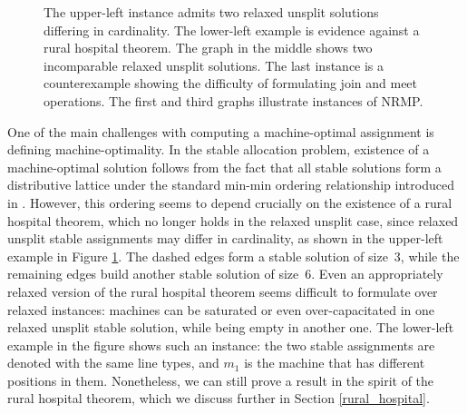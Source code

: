 \documentclass{llncs}
\newcommand{\mycaption}[2]
 {\begin{center} \parbox{4in}{\caption{\small #2 \label{#1}}} \end{center}}
\begin{document}
\begin{figure}[t]
\begin{center}
\begin{minipage}{.35\textwidth}
\end{minipage}
\mycaption{label6}{The upper-left instance admits two relaxed unsplit solutions differing in
cardinality.  The lower-left example is evidence against a rural hospital theorem.  The graph in the middle shows two incomparable relaxed unsplit solutions. The last instance is a counterexample showing the difficulty of formulating join and meet operations. The first and third graphs illustrate instances of NRMP.}
\end{center}
\end{figure}

One of the main challenges with computing a machine-optimal assignment
is defining machine-optimality.  In the stable allocation problem,
existence of a machine-optimal solution follows from the fact that all
stable solutions form a distributive lattice under the standard
min-min ordering relationship introduced in
\cite{DBLP:journals/mor/BaiouB02}.  However, this ordering seems to
depend crucially on the existence of a rural hospital theorem, which
no longer holds in the relaxed unsplit case, since relaxed unsplit
stable assignments may differ in cardinality, as shown in the
upper-left example in Figure \ref{label6}.  The dashed edges form a
stable solution of size~3, while the remaining edges build another
stable solution of size~6. Even an appropriately relaxed version of
the rural hospital theorem seems difficult to formulate over 
relaxed instances: machines can be saturated or even over-capacitated
in one relaxed unsplit stable solution, while being empty in another
one. The lower-left example in the figure shows such an instance: the
two stable assignments are denoted with the same line types, and $m_1$
is the machine that has different positions in them.  Nonetheless,
we can still prove a result in the spirit of the rural hospital theorem,
which we discuss further in Section \ref{rural_hospital}.
\end{document}
